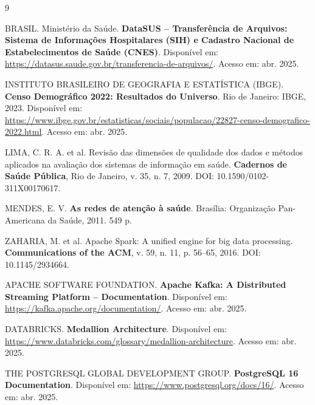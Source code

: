 \documentclass[12pt]{article}
\begin{document}
\begin{thebibliography}{9}

BRASIL. Ministério da Saúde.
\textbf{DataSUS -- Transferência de Arquivos: Sistema de Informações Hospitalares
(SIH) e Cadastro Nacional de Estabelecimentos de Saúde (CNES)}.
Disponível em: \url{https://datasus.saude.gov.br/transferencia-de-arquivos/}.
Acesso em: abr. 2025.

INSTITUTO BRASILEIRO DE GEOGRAFIA E ESTATÍSTICA (IBGE).
\textbf{Censo Demográfico 2022: Resultados do Universo}.
Rio de Janeiro: IBGE, 2023.
Disponível em: \url{https://www.ibge.gov.br/estatisticas/sociais/populacao/22827-censo-demografico-2022.html}.
Acesso em: abr. 2025.

LIMA, C. R. A. et al.
Revisão das dimensões de qualidade dos dados e métodos aplicados na avaliação
dos sistemas de informação em saúde.
\textbf{Cadernos de Saúde Pública}, Rio de Janeiro, v. 35, n. 7, 2009.
DOI: 10.1590/0102-311X00170617.

MENDES, E. V.
\textbf{As redes de atenção à saúde}.
Brasília: Organização Pan-Americana da Saúde, 2011. 549 p.

ZAHARIA, M. et al.
Apache Spark: A unified engine for big data processing.
\textbf{Communications of the ACM}, v. 59, n. 11, p. 56--65, 2016.
DOI: 10.1145/2934664.

APACHE SOFTWARE FOUNDATION.
\textbf{Apache Kafka: A Distributed Streaming Platform -- Documentation}.
Disponível em: \url{https://kafka.apache.org/documentation/}.
Acesso em: abr. 2025.

DATABRICKS.
\textbf{Medallion Architecture}.
Disponível em: \url{https://www.databricks.com/glossary/medallion-architecture}.
Acesso em: abr. 2025.

THE POSTGRESQL GLOBAL DEVELOPMENT GROUP.
\textbf{PostgreSQL 16 Documentation}.
Disponível em: \url{https://www.postgresql.org/docs/16/}.
Acesso em: abr. 2025.

\end{thebibliography}
\end{document}
